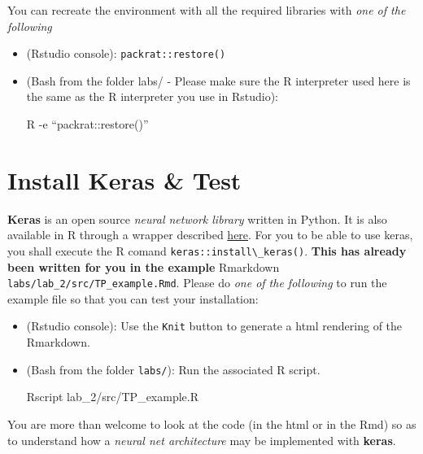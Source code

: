 \documentclass[a4paper, 11pt]{article}
\newcommand{\ri}[1]{\lstinline{#1}}                                                 %
\begin{document}
You can recreate the environment with all the required libraries with \textit{one of the following}
\begin{itemize}
  \item (Rstudio console): \ri{packrat::restore()}
  \item (Bash from the folder labs/ - Please make sure the R interpreter used here is the same as the R interpreter you 
    use in Rstudio):
    \begin{rc}
      R -e ``packrat::restore()''
    \end{rc}
\end{itemize}

\section{Install Keras \& Test}

\textbf{Keras} is an open source \textit{neural network library} written in Python. It is also available in R through a 
wrapper described \href{https://keras.rstudio.com/}{here}. For you to be able to use keras, you shall execute the R 
comand \ri{keras::install\_keras()}. \textbf{This has already been written for you in the example} Rmarkdown 
\texttt{labs/lab\_2/src/TP\_example.Rmd}. Please do \textit{one of the following} to run the example file so that you 
can test your installation:

\begin{itemize}
  \item (Rstudio console): Use the \texttt{Knit} button to generate a html rendering of the Rmarkdown.  \item (Bash from 
    the folder \texttt{labs/}): Run the associated R script.
    \begin{rc}
      Rscript lab_2/src/TP_example.R
    \end{rc}
\end{itemize}
You are more than welcome to look at the code (in the html or in the Rmd) so as to understand how a \textit{neural net 
architecture} may be implemented with \textbf{keras}.
\end{document}
